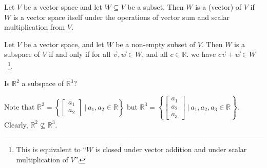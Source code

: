 \documentclass[11pt,fleqn]{book} %
\begin{document}
\setcounter{section}{2}
\setcounter{definitionT}{5}
\begin{definition}[Subspace]
    Let $V$ be a vector space and let $W \subseteq V$ be a  subset. Then $W$ is a (vector)  of $V$ if $W$ is a vector space itself under the operations of vector sum and scalar multiplication from $V$.
\end{definition}
\setcounter{section}{3}

\setcounter{section}{2}
\setcounter{dummy}{7}
\begin{theorem}
    Let $V$ be a vector space, and let $W$ be a non-empty subset of $V$. Then $W$ is a subspace of $V$ if and only if for all $\vec{v}, \vec{w} \in W$, and all $c \in \mathbb{R}$. we have $c\vec{v} + \vec{w} \in W$~\footnote{This is equivalent to ``$W$ is closed under vector addition and under scalar multiplication of $V$''. }.
\end{theorem}
\setcounter{section}{3}

\begin{example}
    Is $\mathbb{R}^2$ a subspace of $\mathbb{R}^3$?

    Note that $\mathbb{R}^2 = \left\{ \begin{bmatrix}a _1 \\ a_2 \end{bmatrix} ~|~ a_1,a_2 \in \mathbb{R} \right\}$ but $\mathbb{R}^3 = \left\{ \begin{bmatrix}a _1 \\ a_2 \\ a_3 \end{bmatrix} ~|~ a_1,a_2,a_3 \in \mathbb{R} \right\}$. Clearly, $\mathbb{R}^2 \not\subseteq \mathbb{R}^3$.
\end{example}
\end{document}
